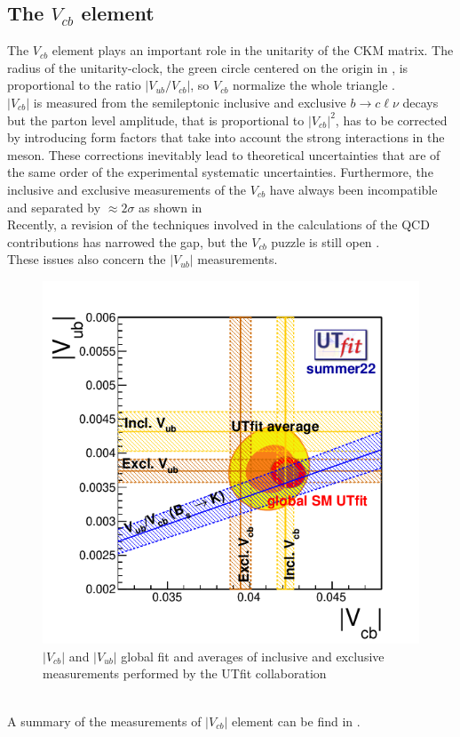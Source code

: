 \subsection{The $V_{cb}$ element}
The $V_{cb}$ element plays an important role in the unitarity of the CKM matrix. The radius of the unitarity-clock, the green circle centered on the origin in , is proportional to the ratio $|V_{ub}/V_{cb}|$, so $V_{cb}$ normalize the whole triangle \cite{Ricciardi2019DeterminationV_cb}.\\
$|V_{cb}|$ is measured from the semileptonic inclusive and exclusive $b \to c\ell\nu$
decays but the parton level amplitude, that is proportional to $|V_{cb}|^2$, has to be corrected by introducing form factors that take into account the strong interactions in the meson. These corrections inevitably lead to theoretical uncertainties that are of the same order of the experimental systematic uncertainties.
Furthermore, the inclusive and exclusive measurements of the $V_{cb}$ have always been incompatible and separated by $\approx 2 \sigma$ as shown in  \\
Recently, a revision of the techniques involved in the calculations of the QCD contributions has narrowed the gap, but the $V_{cb}$ puzzle is still open \cite{Bona2023NewScheme}.\\
These issues also concern the $|V_{ub}|$ measurements.
\\
\begin{figure}[h]
    \centering
    \includegraphics[width=0.7\linewidth]{fig//chap02-theory/vubvcb.png}
    \caption{$|V_{cb}|$ and $|V_{ub}|$ global fit and averages of inclusive and exclusive measurements performed by the UTfit collaboration \cite{Bona2023NewScheme}}
    \label{fig:vcbvub}
\end{figure}
\\
A summary of the measurements of $|V_{cb}|$ element can be find in \cite{PDG_2022}.
